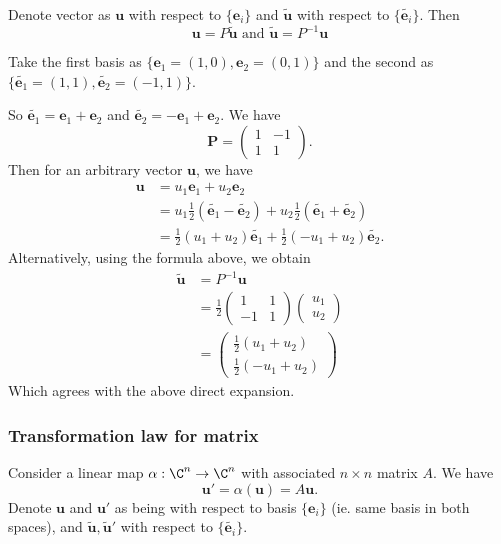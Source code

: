 \documentclass[a4paper]{article}
\begin{document}
\begin{thm}
  Denote vector as $\mathbf{u}$ with respect to $\{\mathbf{e}_i\}$ and $\tilde{\mathbf{u}}$ with respect to $\{\tilde{\mathbf{e}_i}\}$. Then
  \[
    \mathbf{u} = P\mathbf{\tilde{u}}\text{ and }\mathbf{\tilde{u}} = P^{-1}\mathbf{u}
  \]
\end{thm}

\begin{eg}
  Take the first basis as $\{\mathbf{e}_1 = (1, 0), \mathbf{e}_2 = (0, 1)\}$ and the second as $\{\tilde{\mathbf{e}_1} = (1, 1), \tilde{\mathbf{e}_2} = (-1, 1)\}$.

  So $\tilde{\mathbf{e}_1} = \mathbf{e}_1 + \mathbf{e}_2$ and $\tilde{\mathbf{e}_2} = -\mathbf{e}_1 + \mathbf{e}_2$. We have
  \[
    \mathbf{P} =
    \begin{pmatrix}
      1 & -1\\
      1 & 1
    \end{pmatrix}.
  \]
  Then for an arbitrary vector $\mathbf{u}$, we have
  \begin{align*}
    \mathbf{u}&= u_1\mathbf{e}_1 + u_2\mathbf{e}_2\\
    &= u_1\frac{1}{2}(\tilde{\mathbf{e}_1} - \tilde{\mathbf{e}_2}) + u_2\frac{1}{2}(\tilde{\mathbf{e}_1} + \tilde{\mathbf{e}_2})\\
    &= \frac{1}{2}(u_1 + u_2)\tilde{\mathbf{e}_1} + \frac{1}{2}(-u_1 + u_2)\tilde{\mathbf{e}_2}.
  \end{align*}
  Alternatively, using the formula above, we obtain
  \begin{align*}
    \mathbf{\tilde{u}} &= P^{-1} \mathbf{u}\\
    &= \frac{1}{2}
    \begin{pmatrix}
      1&1\\-1&1
    \end{pmatrix}
    \begin{pmatrix}
      u_1\\u_2
    \end{pmatrix}\\
    &=
    \begin{pmatrix}
      \frac{1}{2}(u_1 + u_2)\\
      \frac{1}{2}(-u_1 + u_2)
    \end{pmatrix}
  \end{align*}
  Which agrees with the above direct expansion.
\end{eg}
\subsubsection{Transformation law for matrix}
Consider a linear map $\alpha: \C^n \to \C^n$ with associated $n\times n$ matrix $A$. We have
\[
  \mathbf{u}' = \alpha(\mathbf{u}) = A\mathbf{u}.
\]
Denote $\mathbf{u}$ and $\mathbf{u}'$ as being with respect to basis $\{\mathbf{e}_i\}$ (ie. same basis in both spaces), and $\mathbf{\tilde{u}, \tilde{u}'}$ with respect to $\{\tilde{\mathbf{e}_i}\}$.
\end{document}

